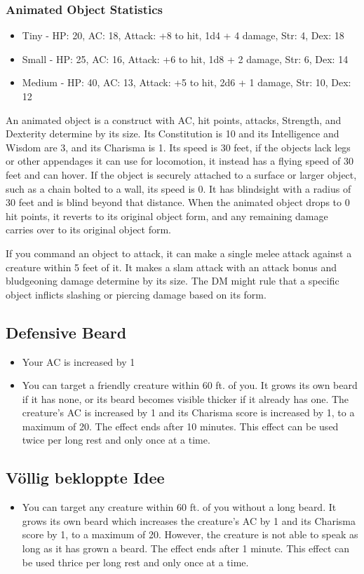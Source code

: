 \subsubsection*{Animated Object Statistics}
\begin{itemize}
	\item Tiny - HP: 20, AC: 18, Attack: +8 to hit, 1d4 + 4 damage, Str: 4, Dex: 18
	\item Small - HP: 25, AC: 16, Attack: +6 to hit, 1d8 + 2 damage, Str: 6, Dex: 14
	\item Medium - HP: 40, AC: 13, Attack: +5 to hit, 2d6 + 1 damage, Str: 10, Dex: 12
\end{itemize}
	
An animated object is a construct with AC, hit points, attacks, Strength, and Dexterity determine by its size. Its Constitution is 10 and its Intelligence and Wisdom are 3, and its Charisma is 1. Its speed is 30 feet, if the objects lack legs or other appendages it can use for locomotion, it instead has a flying speed of 30 feet and can hover. If the object is securely attached to a surface or larger object, such as a chain bolted to a wall, its speed is 0. It has blindsight with a radius of 30 feet and is blind beyond that distance. When the animated object drops to 0 hit points, it reverts to its original object form, and any remaining damage carries over to its original object form.

If you command an object to attack, it can make a single melee attack against a creature within 5 feet of it. It makes a slam attack with an attack bonus and bludgeoning damage determine by its size. The DM might rule that a specific object inflicts slashing or piercing damage based on its form.

\subsection*{Defensive Beard}
\begin{itemize}
	\item Your AC is increased by 1
	\item You can target a friendly creature within 60 ft. of you. It grows its own beard if it has none, or its beard becomes visible thicker if it already has one. The creature's AC is increased by 1 and its Charisma score is increased by 1, to a maximum of 20. The effect ends after 10 minutes. This effect can be used twice per long rest and only once at a time.
\end{itemize}

\subsection*{Völlig bekloppte Idee}
\begin{itemize}
	\item You can target any creature within 60 ft. of you without a long beard. It grows its own beard which increases the creature's AC by 1 and its Charisma score by 1, to a maximum of 20. However, the creature is not able to speak as long as it has grown a beard. The effect ends after 1 minute. This effect can be used thrice per long rest and only once at a time.
\end{itemize}